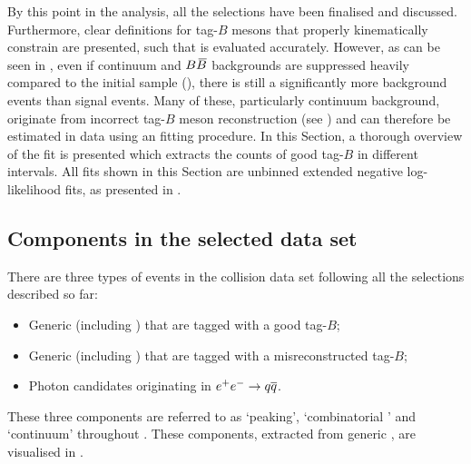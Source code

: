 By this point in the analysis, all the selections have been finalised and discussed.
Furthermore, clear definitions for tag-$B$ mesons that properly kinematically constrain \BtoXsgamma are presented, such that \EB is evaluated accurately.
However, as can be seen in , even if continuum and $B\kern 0.18em\overline{\kern -0.18em B}{}$ backgrounds are suppressed heavily compared to the initial sample (),
there is still a significantly more background events than \BtoXsgamma signal events.
Many of these, particularly continuum background, originate from incorrect tag-$B$ meson reconstruction (see ) and can therefore be estimated in data using an \Mbc fitting procedure.
In this Section, a thorough overview of the \Mbc fit is presented which extracts the counts of good tag-$B$ in different \EB intervals.
All fits shown in this Section are unbinned extended negative log-likelihood fits, as presented in .


\subsection{Components in the selected data set}\label{sec:fitting_components}

There are three types of events in the \epem collision data set following all the selections described so far:
\begin{itemize}
    \item Generic \BB (including \BtoXsgamma) that are tagged with a good tag-$B$;
    \item Generic \BB (including \BtoXsgamma) that are tagged with a misreconstructed tag-$B$;
    \item Photon candidates originating in $e^+e^-\rightarrow q\overline q$.
\end{itemize}
These three components are referred to as `peaking', `combinatorial \BB' and `continuum' throughout .
These components, extracted from generic \MC, are visualised in .

